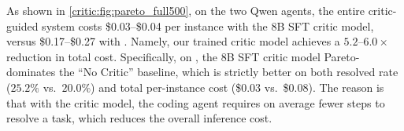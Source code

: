 \begin{table}[t]
\centering
\caption{Resolved rate (\%) of critic models trained with different SFT corpus on SWE-Bench Verified. All critic models use $k{=}5$; arrows show gains over no critic.}
\label{critic:tab:critic_ablation}
\end{table}


As shown in \autoref{critic:fig:pareto_full500}, on the two Qwen agents, the entire critic-guided system costs \$0.03--\$0.04 per instance with the 8B SFT critic model, versus \$0.17--\$0.27 with \criticopus{}.
Namely, our trained critic model achieves a $5.2$--$6.0\times$ reduction in total cost.
Specifically, on \criticqwenNext{}, the 8B SFT critic model Pareto-dominates the ``No Critic'' baseline, which is strictly better on both resolved rate ($25.2\%$ vs.\ $20.0\%$) and total per-instance cost (\$0.03 vs.\ \$0.08).
The reason is that with the critic model, the \criticqwenNext{} coding agent requires on average fewer steps to resolve a task, which reduces the overall inference cost.

